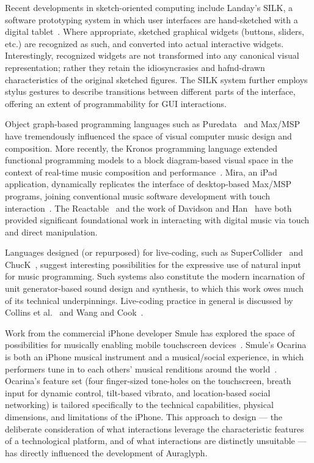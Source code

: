 \documentclass{nime-alternate}
\begin{document}
Recent developments in sketch-oriented computing include Landay's SILK, a software prototyping system in which user interfaces are hand-sketched with a digital tablet~\cite{landay1996interactive}. 
Where appropriate, sketched graphical widgets (buttons, sliders, etc.) are recognized as such, and converted into actual interactive widgets.
Interestingly, recognized widgets are not transformed into any canonical visual representation; rather they retain the idiosyncrasies and hafnd-drawn characteristics of the original sketched figures. 
The SILK system further employs stylus gestures to describe transitions between different parts of the interface, offering an extent of programmability for GUI interactions. 

Object graph-based programming languages such as Puredata~\cite{puckette1996pure} and Max/MSP~\cite{zicarelli1998extensible} have tremendously influenced the space of visual computer music design and composition. 
More recently, the Kronos programming language extended functional programming models to a block diagram-based visual space in the context of real-time music composition and performance~\cite{norilo2012visualization}. 
Mira, an iPad application, dynamically replicates the interface of desktop-based Max/MSP programs, joining conventional music software development with touch interaction~\cite{tarakajian2013anmira}. 
The Reactable~\cite{jorda2007reactable} and the work of Davidson and Han~\cite{davidson2006synthesis} have both provided significant foundational work in interacting with digital music via touch and direct manipulation. 

Languages designed (or repurposed) for live-coding, such as SuperCollider~\cite{mccartney2002supercollider} and ChucK~\cite{wang2008chuck}, suggest interesting possibilities for the expressive use of natural input for music programming. 
Such systems also constitute the modern incarnation of unit generator-based sound design and synthesis, to which this work owes much of its technical underpinnings. 
Live-coding practice in general is discussed by Collins et al.~\cite{collins2003live} and Wang and Cook~\cite{wang2004onthefly}. 

Work from the commercial iPhone developer Smule has explored the space of possibilities for musically enabling mobile touchscreen devices~\cite{wang2009smule}. 
Smule's Ocarina is both an iPhone musical instrument and a musical/social experience, in which performers tune in to each others' musical renditions around the world~\cite{wang2014ocarina}. 
Ocarina's feature set (four finger-sized tone-holes on the touchscreen, breath input for dynamic control, tilt-based vibrato, and location-based social networking) is tailored specifically to the technical capabilities, physical dimensions, and limitations of the iPhone. 
This approach to design --- the deliberate consideration of what interactions leverage the characteristic features of a technological platform, and of what interactions are distinctly unsuitable --- has directly influenced the development of Auraglyph. 
\end{document}
